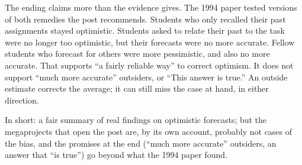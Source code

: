 \begin{afterword}
The ending claims more than the evidence gives. The 1994 paper tested versions of both remedies the post recommends. Students who only recalled their past assignments stayed optimistic. Students asked to relate their past to the task were no longer too optimistic, but their forecasts were no more accurate. Fellow students who forecast for others were more pessimistic, and also no more accurate. That supports ``a fairly reliable way'' to correct optimism. It does not support ``much more accurate'' outsiders, or ``This answer is true.'' An outside estimate corrects the average; it can still miss the case at hand, in either direction.

In short: a fair summary of real findings on optimistic forecasts; but the megaprojects that open the post are, by its own account, probably not cases of the bias, and the promises at the end (``much more accurate'' outsiders, an answer that ``is true'') go beyond what the 1994 paper found.
\end{afterword}
